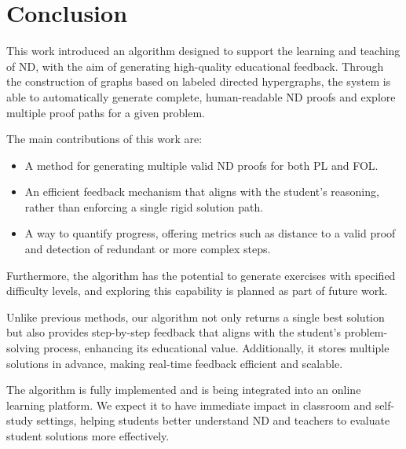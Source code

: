 \section{Conclusion}
This work introduced an algorithm designed to support the learning and teaching of ND, with the aim of generating high-quality educational feedback. Through the construction of graphs based on labeled directed hypergraphs, the system is able to automatically generate complete, human-readable ND proofs and explore multiple proof paths for a given problem.

The main contributions of this work are:
\begin{itemize}
    \item A method for generating multiple valid ND proofs for both PL and FOL.
    \item An efficient feedback mechanism that aligns with the student’s reasoning, rather than enforcing a single rigid solution path.
    \item A way to quantify progress, offering metrics such as distance to a valid proof and detection of redundant or more complex steps.
\end{itemize}

Furthermore, the algorithm has the potential to generate exercises with specified difficulty levels, and exploring this capability is planned as part of future work.

Unlike previous methods, our algorithm not only returns a single best solution but also provides step-by-step feedback that aligns with the student’s problem-solving process, enhancing its educational value. Additionally, it stores multiple solutions in advance, making real-time feedback efficient and scalable.

The algorithm is fully implemented and is being integrated into an online learning platform. We expect it to have immediate impact in classroom and self-study settings, helping students better understand ND and teachers to evaluate student solutions more effectively.